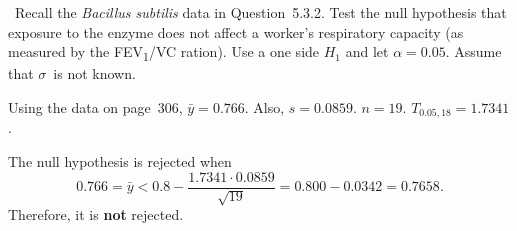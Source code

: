 \begin{problem}
  ~Recall the \textit{Bacillus subtilis} data in Question~5.3.2.  Test the null hypothesis that exposure to the enzyme does not affect a worker's respiratory capacity (as measured by the FEV\textsubscript{1}/VC ration).  Use a one side $H_1$ and let ${\alpha = 0.05}$.  Assume that $\sigma$~is not known.
\end{problem}

Using the data on page~306, ${\bar{y} = 0.766}$.  Also, ${s = 0.0859}$.  ${n = 19}$.  ${T_{0.05,18} = 1.7341}$.

The null hypothesis is rejected when
\begin{equation}
  0.766 = \bar{y} < 0.8 - \frac{1.7341 \cdot 0.0859}{\sqrt{19}} = 0.800 - 0.0342 = 0.7658 \text{.}
\end{equation}
Therefore, it is \textbf{not} rejected.
